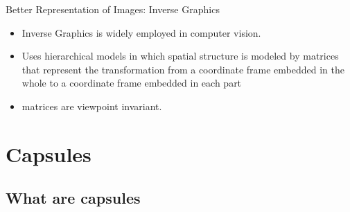 \documentclass{beamer}
\begin{document}
\begin{frame}{Better Representation of Images: Inverse Graphics}
    \begin{itemize}
        \item Inverse Graphics is widely employed in computer vision.
        \item Uses hierarchical models in which spatial structure is modeled by matrices that represent the transformation from a coordinate frame embedded in the whole to a coordinate frame embedded in each part
        \item matrices are viewpoint invariant.
    \end{itemize}
    
    
    \begin{figure}[h]
        \centering
        \qquad
        \label{}

        
    \end{figure}
\end{frame}

\section{Capsules}
\subsection{What are capsules}
\end{document}
